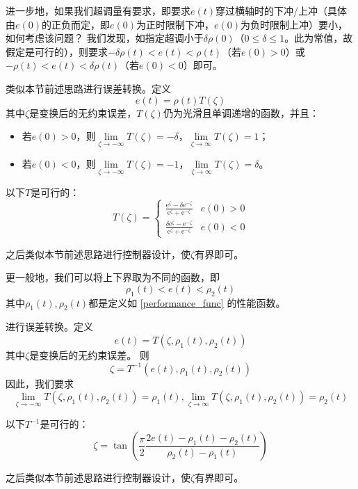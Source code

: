 进一步地，如果我们超调量有要求，即要求$e(t)$穿过横轴时的下冲/上冲（具体由$e(0)$的正负而定，即$e(0)$为正时限制下冲，$e(0)$为负时限制上冲）要小，如何考虑该问题？
我们发现，如指定超调小于$\delta\rho(0)$（$0\le\delta\le 1$。此为常值，故假定是可行的），则要求$-\delta\rho(t)<e(t)<\rho(t)$（若$e(0)>0$）或$-\rho(t)<e(t)<\delta\rho(t)$（若$e(0)<0$）即可。

类似本节前述思路进行误差转换。定义\[e(t)=\rho(t)T(\zeta)\]
其中$\zeta$是变换后的无约束误差，$T(\zeta)$仍为光滑且单调递增的函数，并且：
\begin{itemize}[leftmargin=1em]
    \item 若$e(0)>0$，则$\lim\limits_{\zeta\to-\infty}T(\zeta)=-\delta$，$\lim\limits_{\zeta\to\infty}T(\zeta)=1$；
    \item 若$e(0)<0$，则$\lim\limits_{\zeta\to-\infty}T(\zeta)=-1$，$\lim\limits_{\zeta\to\infty}T(\zeta)=\delta$。
\end{itemize}

\begin{example}
    以下$T$是可行的：
    \[T(\zeta) = \begin{cases}
        \frac{\mathrm{e}^\zeta-\delta \mathrm{e}^{-\zeta}}{\mathrm{e}^\zeta+ \mathrm{e}^{-\zeta}}&e(0)>0\\
        \frac{\delta\mathrm{e}^\zeta- \mathrm{e}^{-\zeta}}{\mathrm{e}^\zeta+ \mathrm{e}^{-\zeta}}&e(0)<0
    \end{cases}\]
\end{example}
之后类似本节前述思路进行控制器设计，使$\zeta$有界即可。

更一般地，我们可以将上下界取为不同的函数，即
\[\rho_1(t)<e(t)<\rho_2(t)\]
其中$\rho_1(t),\rho_2(t)$都是定义如 \ref{performance_func} 的性能函数。

进行误差转换。定义\[e(t)=T(\zeta,\rho_1(t),\rho_2(t))\]
其中$\zeta$是变换后的无约束误差。
则\[\zeta = T^{-1}(e(t),\rho_1(t),\rho_2(t))\]
因此，我们要求\[\lim\limits_{\zeta\to-\infty}T(\zeta,\rho_1(t),\rho_2(t))=\rho_1(t),\lim\limits_{\zeta\to\infty}T(\zeta,\rho_1(t),\rho_2(t))=\rho_2(t)\]
\begin{example}
    以下$T^{-1}$是可行的：
    \[\zeta = \tan\left(\frac{\pi}{2}\frac{2e(t)-\rho_1(t)-\rho_2(t)}{\rho_2(t)-\rho_1(t)}\right)\]
\end{example}

之后类似本节前述思路进行控制器设计，使$\zeta$有界即可。